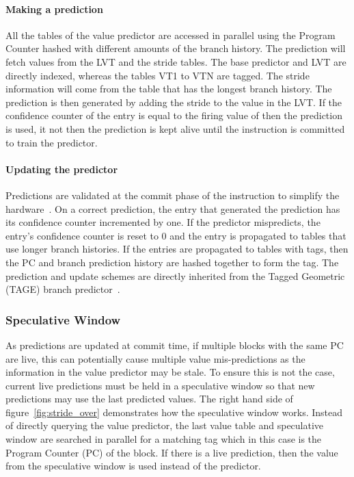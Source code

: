 \paragraph*{Making a prediction}
All the tables of the value predictor are accessed in parallel using the Program Counter hashed with different amounts of the branch history.
The prediction will fetch values from the LVT and the stride tables.
The base predictor and LVT are directly indexed, whereas the tables VT1 to VTN are tagged.
The stride information will come from the table that has the longest branch history.
The prediction is then generated by adding the stride to the value in the LVT.
If the confidence counter of the entry is equal to the firing value of then the prediction is used, it not then the prediction is kept alive until the instruction is committed to train the predictor.

\paragraph*{Updating the predictor}
Predictions are validated at the commit phase of the instruction to simplify the hardware~\cite{peraisVTAGE2014}.
On a correct prediction, the entry that generated the prediction has its confidence counter incremented by one.
If the predictor mispredicts, the entry's confidence counter is reset to 0 and the entry is propagated to tables that use longer branch histories.
If the entries are propagated to tables with tags, then the PC and branch prediction history are hashed together to form the tag.
The prediction and update schemes are directly inherited from the Tagged Geometric (TAGE) branch predictor~\cite{SeznecITTAGE}.

\subsubsection{Speculative Window}
As predictions are updated at commit time, if multiple blocks with the same PC are live, this can potentially cause multiple value mis-predictions as the information in the value predictor may be stale.
To ensure this is not the case, current live predictions must be held in a speculative window so that new predictions may use the last predicted values.
The right hand side of figure~\ref{fig:stride_over} demonstrates how the speculative window works. 
Instead of directly querying the value predictor, the last value table and speculative window are searched in parallel for a matching tag which in this case is the Program Counter (PC) of the block.
If there is a live prediction, then the value from the speculative window is used instead of the predictor.

